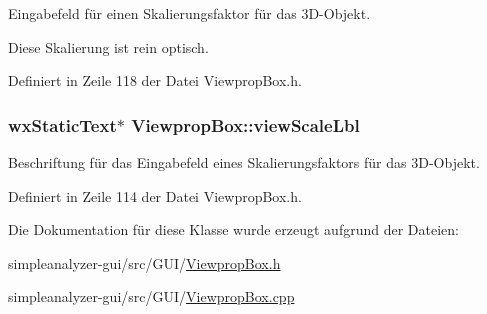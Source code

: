 Eingabefeld für einen Skalierungsfaktor für das 3\-D-\/\-Objekt. 

Diese Skalierung ist rein optisch. 

Definiert in Zeile 118 der Datei Viewprop\-Box.\-h.

\hypertarget{classViewpropBox_ab312348ae97369e3b8a1a7ce8ba9e2b1}{
\subsubsection[{view\-Scale\-Lbl}]{\setlength{\rightskip}{0pt plus 5cm}wx\-Static\-Text$\ast$ Viewprop\-Box\-::view\-Scale\-Lbl\hspace{0.3cm}{\ttfamily [private]}}}\label{classViewpropBox_ab312348ae97369e3b8a1a7ce8ba9e2b1}


Beschriftung für das Eingabefeld eines Skalierungsfaktors für das 3\-D-\/\-Objekt. 



Definiert in Zeile 114 der Datei Viewprop\-Box.\-h.



Die Dokumentation für diese Klasse wurde erzeugt aufgrund der Dateien\-:\begin{DoxyCompactItemize}
\item 
simpleanalyzer-\/gui/src/\-G\-U\-I/\hyperlink{ViewpropBox_8h}{Viewprop\-Box.\-h}\item 
simpleanalyzer-\/gui/src/\-G\-U\-I/\hyperlink{ViewpropBox_8cpp}{Viewprop\-Box.\-cpp}\end{DoxyCompactItemize}
